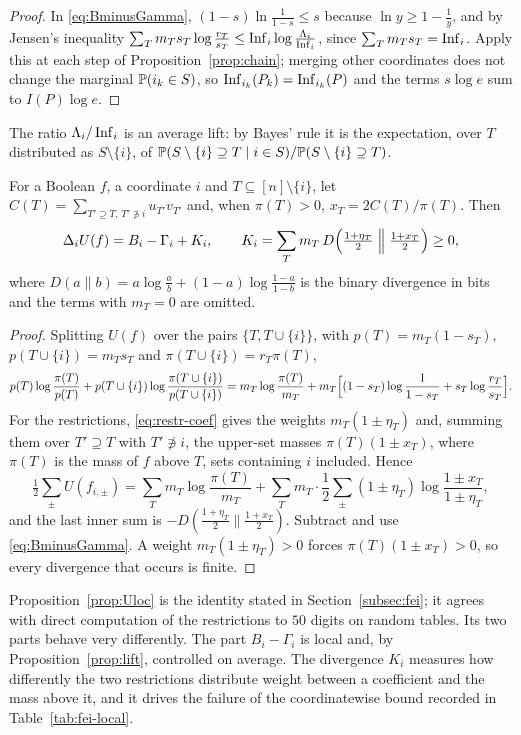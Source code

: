 \begin{proof}
In \eqref{eq:BminusGamma}, $(1-s)\ln\frac1{1-s}\le s$ because $\ln y\ge1-\frac1y$, and by Jensen's inequality $\sum_Tm_Ts_T\log\frac{r_T}{s_T}\le\operatorname{Inf}_i\log\frac{\Lambda_i}{\operatorname{Inf}_i}$, since $\sum_Tm_Ts_T=\operatorname{Inf}_i$. Apply this at each step of Proposition~\ref{prop:chain}; merging other coordinates does not change the marginal $\mathbb{P}(i_k\in S)$, so $\operatorname{Inf}_{i_k}(P_k)=\operatorname{Inf}_{i_k}(P)$ and the terms $s\log e$ sum to $I(P)\log e$.
\end{proof}

The ratio $\Lambda_i/\operatorname{Inf}_i$ is an average lift: by Bayes' rule it is the expectation, over $T$ distributed as $S\setminus\{i\}$, of $\mathbb{P}(S\setminus\{i\}\supseteq T\mid i\in S)/\mathbb{P}(S\setminus\{i\}\supseteq T)$.

\begin{proposition}\label{prop:Uloc}
For a Boolean $f$, a coordinate $i$ and $T\subseteq[n]\setminus\{i\}$, let $C(T)=\sum_{T'\supseteq T,\,T'\not\ni i}u_{T'}v_{T'}$ and, when $\pi(T)>0$, $x_T=2C(T)/\pi(T)$. Then
\[
\Delta_iU(f)=B_i-\Gamma_i+K_i,\qquad K_i=\sum_Tm_T\,D\Bigl(\tfrac{1+\eta_T}{2}\Bigm\|\tfrac{1+x_T}{2}\Bigr)\ge0,
\]
where $D(a\|b)=a\log\frac ab+(1-a)\log\frac{1-a}{1-b}$ is the binary divergence in bits and the terms with $m_T=0$ are omitted.
\end{proposition}

\begin{proof}
Splitting $U(f)$ over the pairs $\{T,T\cup\{i\}\}$, with $p(T)=m_T(1-s_T)$, $p(T\cup\{i\})=m_Ts_T$ and $\pi(T\cup\{i\})=r_T\pi(T)$,
\[
p(T)\log\frac{\pi(T)}{p(T)}+p(T\cup\{i\})\log\frac{\pi(T\cup\{i\})}{p(T\cup\{i\})}=m_T\log\frac{\pi(T)}{m_T}+m_T\Bigl[(1-s_T)\log\frac1{1-s_T}+s_T\log\frac{r_T}{s_T}\Bigr].
\]
For the restrictions, \eqref{eq:restr-coef} gives the weights $m_T(1\pm\eta_T)$ and, summing them over $T'\supseteq T$ with $T'\not\ni i$, the upper-set masses $\pi(T)(1\pm x_T)$, where $\pi(T)$ is the mass of $f$ above $T$, sets containing $i$ included. Hence
\[
\tfrac12\textstyle\sum_\pm U(f_{i,\pm})=\sum_Tm_T\log\frac{\pi(T)}{m_T}+\sum_Tm_T\cdot\frac12\sum_\pm(1\pm\eta_T)\log\frac{1\pm x_T}{1\pm\eta_T},
\]
and the last inner sum is $-D(\frac{1+\eta_T}2\|\frac{1+x_T}2)$. Subtract and use \eqref{eq:BminusGamma}. A weight $m_T(1\pm\eta_T)>0$ forces $\pi(T)(1\pm x_T)>0$, so every divergence that occurs is finite.
\end{proof}

Proposition~\ref{prop:Uloc} is the identity stated in Section~\ref{subsec:fei}; it agrees with direct computation of the restrictions to $50$ digits on random tables. Its two parts behave very differently. The part $B_i-\Gamma_i$ is local and, by Proposition~\ref{prop:lift}, controlled on average. The divergence $K_i$ measures how differently the two restrictions distribute weight between a coefficient and the mass above it, and it drives the failure of the coordinatewise bound recorded in Table~\ref{tab:fei-local}.

